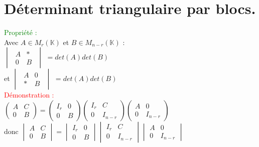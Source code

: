 \documentclass{article}
\begin{document}
\section{Déterminant triangulaire par blocs.}
\textcolor{green}{Propriété :} \\
  Avec $A \in M_{r} (\mathbb K)$ et $B \in M_{n-r}(\mathbb K)$ : \\
  $\begin{vmatrix} \begin{array}{l|r}
A & \ast \\ \hline  0 & B \end{array} \end{vmatrix}$ $=det(A) det(B)$ \\
  et $\begin{vmatrix} \begin{array}{l|r}
A & 0 \\ \hline \ast & B \end{array} \end{vmatrix}$ $=det(A) det(B)$ \\
  \textcolor{red}{Démonstration :} \\
  $\begin{pmatrix} A & C \\ 0 & B \end{pmatrix}= \begin{pmatrix} I_r & 0 \\ 0 & B \end{pmatrix} \begin{pmatrix} I_r & C \\ 0 & I_{n-r} \end{pmatrix}\begin{pmatrix} A & 0 \\ 0 & I_{n-r} \end{pmatrix} $ \\
  donc $\begin{vmatrix} A & C \\ 0 & B \end{vmatrix}= \begin{vmatrix} I_r & 0 \\ 0 & B \end{vmatrix} \begin{vmatrix} I_r & C \\ 0 & I_{n-r} \end{vmatrix}\begin{vmatrix} A & 0 \\ 0 & I_{n-r} \end{vmatrix} $ \\
\end{document}
